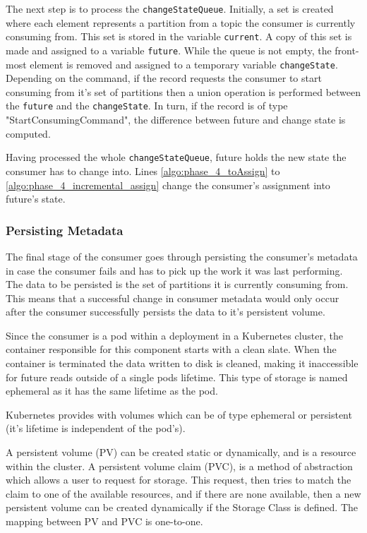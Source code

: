 The next step is to process the \lstinline[language=Python]{changeStateQueue}.
Initially, a set is created where each element represents a partition from a
topic the consumer is currently consuming from. This set is stored in the
variable \lstinline[language=Python]{current}. A copy of this set is made and
assigned to a variable \lstinline[language=Python]{future}. While the queue is
not empty, the front-most element is removed and assigned to a temporary
variable \lstinline[language=Python]{changeState}. Depending on the command, if
the record requests the consumer to start consuming from it's set of partitions
then a union operation is performed between the
\lstinline[language=Python]{future} and the
\lstinline[language=Python]{changeState}. In turn, if the record is of type
"StartConsumingCommand", the difference between future and change state is
computed.

Having processed the whole \lstinline[language=Python]{changeStateQueue}, future
holds the new state the consumer has to change into. Lines
\ref{algo:phase_4_toAssign} to \ref{algo:phase_4_incremental_assign} change the
consumer's assignment into future's state.

\subsubsection{Persisting Metadata}

The final stage of the consumer goes through persisting the consumer's metadata
in case the consumer fails and has to pick up the work it was last performing.
The data to be persisted is the set of partitions it is currently consuming
from. This means that a successful change in consumer metadata would only occur
after the consumer successfully persists the data to it's persistent volume.

Since the consumer is a pod within a deployment in a Kubernetes cluster, the
container responsible for this component starts with a clean slate. When the
container is terminated the data written to disk is cleaned,  making it
inaccessible for future reads outside of a single pods lifetime. This type of
storage is named ephemeral as it has the same lifetime as the pod.

Kubernetes provides with volumes which can be of type ephemeral or persistent
(it's lifetime is independent of the pod's). 

A persistent volume (PV) can be created static or dynamically, and is a resource
within the cluster. A persistent volume claim (PVC), is a method of abstraction
which allows a user to request for storage. This request, then tries to match
the claim to one of the available resources, and if there are none available,
then a new persistent volume can be created dynamically if the Storage Class is
defined. The mapping between PV and PVC is one-to-one.

